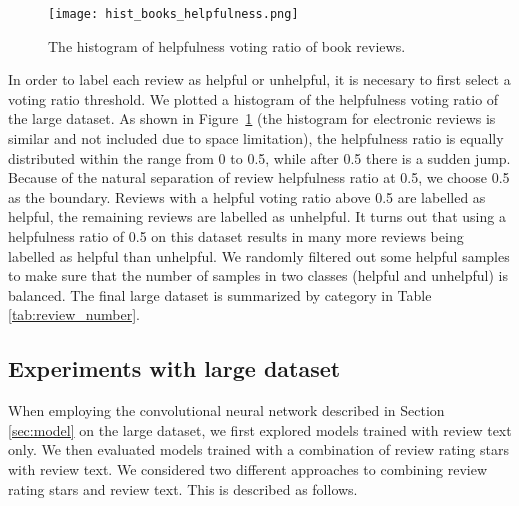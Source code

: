 \documentclass[conference,compsoc]{IEEEtran}
\begin{document}
\begin{figure}[t]
	\graphicspath{ {./figures/} }
	\centering
	\texttt{[image: hist\_books\_helpfulness.png]}
	\caption{The histogram of helpfulness voting ratio of book reviews.}
	\label{fig:hist_help_ratio}
\end{figure}%

In order to label each review as helpful or unhelpful, it is necesary to first  select a voting ratio threshold. We plotted a histogram of the helpfulness voting ratio of the large dataset. As shown in Figure~\ref{fig:hist_help_ratio} (the histogram for electronic reviews is similar and not included due to space limitation), the helpfulness ratio is equally distributed within the range from 0 to 0.5, while after 0.5 there is a sudden jump. Because of the natural separation of review helpfulness ratio at 0.5, we choose 0.5 as the boundary. Reviews with a helpful voting ratio above 0.5 are labelled as helpful, the remaining reviews are labelled as unhelpful.
It turns out that using a helpfulness ratio of 0.5 on this dataset results in many more reviews being labelled as helpful than unhelpful.
We randomly filtered out some helpful samples to make sure that the number of samples in two classes (helpful and unhelpful) is balanced. The final large dataset is summarized by category in Table \ref{tab:review_number}.

\subsection{Experiments with large dataset}
When employing the convolutional neural network described in Section \ref{sec:model} on the large dataset, we first explored models trained with review text only. We then evaluated models trained with a combination of review rating stars with review text. We considered two different approaches to combining  review rating stars and review text. This is described as follows.
\end{document}
